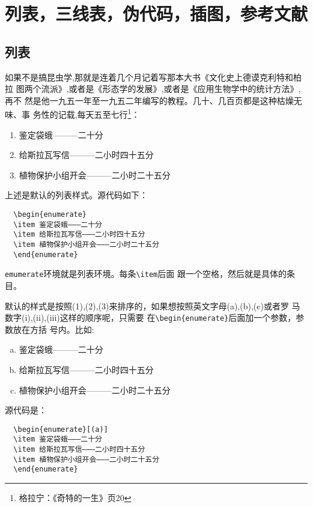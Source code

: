 
\chapter{列表，三线表，伪代码，插图，参考文献}
\label{chap02}

\section{列表}
\label{sec:23}

如果不是搞昆虫学,那就是连着几个月记着写那本大书《文化史上德谟克利特和柏拉
图两个流派》,或者是《形态学的发展》,或者是《应用生物学中的统计方法》,再不
然是他一九五一年至一九五二年编写的教程。几十、几百页都是这种枯燥无味、事
务性的记载,每天五至七行\footnote{格拉宁：《奇特的一生》页20}：
\begin{enumerate}
\item 鉴定袋蛾———二十分
\item 给斯拉瓦写信———二小时四十五分
\item 植物保护小组开会———二小时二十五分
\end{enumerate}

上述是默认的列表样式。源代码如下：
\begin{lstlisting}
  \begin{enumerate}
  \item 鉴定袋蛾———二十分
  \item 给斯拉瓦写信———二小时四十五分
  \item 植物保护小组开会———二小时二十五分
  \end{enumerate}
\end{lstlisting}

\texttt{emumerate}环境就是列表环境。每条\texttt{\textbackslash{item}}后面
跟一个空格，然后就是具体的条目。

默认的样式是按照(1),(2),(3)来排序的，如果想按照英文字母(a),(b),(c)或者罗
马数字(i),(ii),(iii)这样的顺序呢，只需要
在\texttt{\textbackslash{begin}\{enumerate\}}后面加一个参数，参数放在方括
号内。比如:
\begin{enumerate}[(a)]
\item 鉴定袋蛾———二十分
\item 给斯拉瓦写信———二小时四十五分
\item 植物保护小组开会———二小时二十五分
\end{enumerate}
源代码是：
\begin{lstlisting}
  \begin{enumerate}[(a)]
  \item 鉴定袋蛾———二十分
  \item 给斯拉瓦写信———二小时四十五分
  \item 植物保护小组开会———二小时二十五分
  \end{enumerate}
\end{lstlisting}

